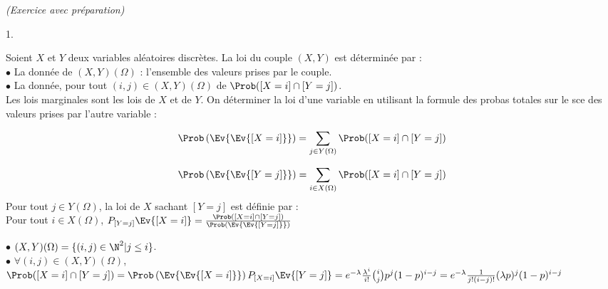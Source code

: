 \documentclass[11pt]{article}%
\begin{document}
 \begin{exercice}{\it (Exercice avec préparation)}~
 \begin{noliste}{1.}
 \setlength{\itemsep}{4mm}
 \item Soient $X$ et $Y$ deux variables aléatoires discrètes. La loi du
couple $(X,Y)$ est déterminée par : \\
 $ \bullet$ La donnée de $(X,Y)(\Omega)$ : l'ensemble des valeurs
prises par le couple.\\
 $\bullet$ La donnée, pour tout $(i,j) \in (X,Y)(\Omega)$ de $\Prob([X
= i] \cap [Y = j])$.\\
 Les lois marginales sont les lois de $X$ et de $Y$. On déterminer la
loi d'une variable en utilisant la formule des probas totales sur le
sce des valeurs prises par l'autre variable : 
 
\[
 \Prob\left(\Ev{\Ev{[X = i]}}\right) = \sum \limits_{j \in Y(\Omega)}
\Prob([X = i] \cap [Y = j])
\]

\[
 \Prob\left(\Ev{\Ev{[Y = j]}}\right) = \sum \limits_{i \in X(\Omega)}
\Prob([X = i] \cap [Y = j]) 
\]
 Pour tout $j \in Y(\Omega)$, la loi de $X$ sachant $[Y = j]$ est
définie par : \\
 Pour tout $i \in X(\Omega)$, $P_{[Y = j]} \Ev{[X = i]} =
\frac{\Prob([X = i] \cap [Y = j])} {\Prob\left(\Ev{\Ev{[Y =
j]}}\right)}$

\item $\bullet$ $(X,Y)( \Omega) = \{(i,j) \in \N^{2} | j \leq i\}$.\\
  $\bullet$ $\forall (i,j) \in (X,Y)(\Omega)$, $\Prob([X = i] \cap [Y
  = j]) = \Prob\left(\Ev{\Ev{[X = i]}}\right)P_{[X = i]}\Ev{ [Y = j]}
  = e^{-\lambda} \frac{\lambda^{i}}{i!} \binom{i}{j} p^{j} (1-p)^{i-j}
  = e^{-\lambda} \frac{1}{j!(i-j)!}(\lambda p)^{j} (1-p)^{i-j} $


\end{noliste}
\end{exercice}
\end{document}
